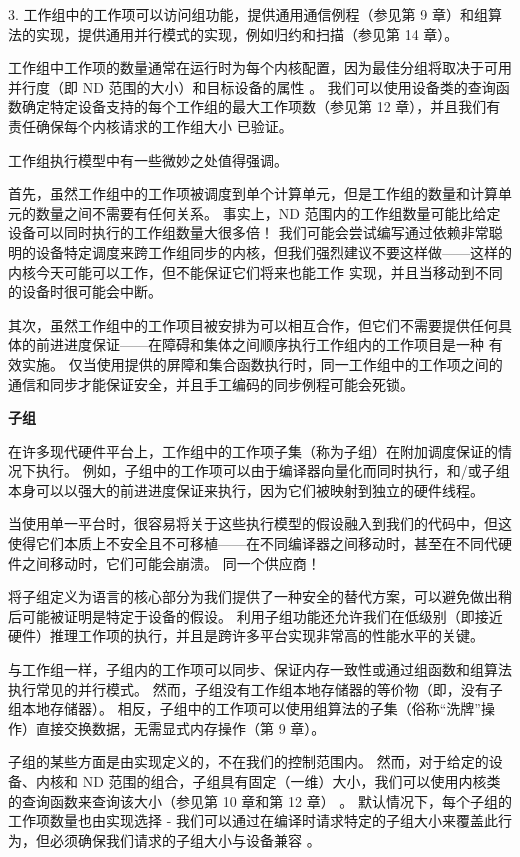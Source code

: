 3. 工作组中的工作项可以访问组功能，提供通用通信例程（参见第 9 章）和组算法的实现，提供通用并行模式的实现，例如归约和扫描（参见第 14 章）。

工作组中工作项的数量通常在运行时为每个内核配置，因为最佳分组将取决于可用并行度（即 ND 范围的大小）和目标设备的属性 。 我们可以使用设备类的查询函数确定特定设备支持的每个工作组的最大工作项数（参见第 12 章），并且我们有责任确保每个内核请求的工作组大小 已验证。

工作组执行模型中有一些微妙之处值得强调。

首先，虽然工作组中的工作项被调度到单个计算单元，但是工作组的数量和计算单元的数量之间不需要有任何关系。 事实上，ND 范围内的工作组数量可能比给定设备可以同时执行的工作组数量大很多倍！ 我们可能会尝试编写通过依赖非常聪明的设备特定调度来跨工作组同步的内核，但我们强烈建议不要这样做——这样的内核今天可能可以工作，但不能保证它们将来也能工作 实现，并且当移动到不同的设备时很可能会中断。

其次，虽然工作组中的工作项目被安排为可以相互合作，但它们不需要提供任何具体的前进进度保证——在障碍和集体之间顺序执行工作组内的工作项目是一种 有效实施。 仅当使用提供的屏障和集合函数执行时，同一工作组中的工作项之间的通信和同步才能保证安全，并且手工编码的同步例程可能会死锁。

\textbf{子组}

在许多现代硬件平台上，工作组中的工作项子集（称为子组）在附加调度保证的情况下执行。 例如，子组中的工作项可以由于编译器向量化而同时执行，和/或子组本身可以以强大的前进进度保证来执行，因为它们被映射到独立的硬件线程。

当使用单一平台时，很容易将关于这些执行模型的假设融入到我们的代码中，但这使得它们本质上不安全且不可移植——在不同编译器之间移动时，甚至在不同代硬件之间移动时，它们可能会崩溃。 同一个供应商！

将子组定义为语言的核心部分为我们提供了一种安全的替代方案，可以避免做出稍后可能被证明是特定于设备的假设。 利用子组功能还允许我们在低级别（即接近硬件）推理工作项的执行，并且是跨许多平台实现非常高的性能水平的关键。

与工作组一样，子组内的工作项可以同步、保证内存一致性或通过组函数和组算法执行常见的并行模式。 然而，子组没有工作组本地存储器的等价物（即，没有子组本地存储器）。 相反，子组中的工作项可以使用组算法的子集（俗称“洗牌”操作）直接交换数据，无需显式内存操作（第 9 章）。

子组的某些方面是由实现定义的，不在我们的控制范围内。 然而，对于给定的设备、内核和 ND 范围的组合，子组具有固定（一维）大小，我们可以使用内核类的查询函数来查询该大小（参见第 10 章和第 12 章） 。 默认情况下，每个子组的工作项数量也由实现选择 - 我们可以通过在编译时请求特定的子组大小来覆盖此行为，但必须确保我们请求的子组大小与设备兼容 。

